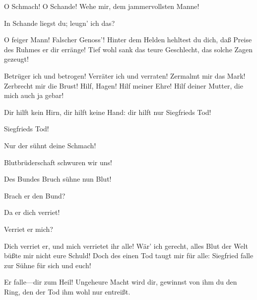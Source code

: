 \begin{drama}
O Schmach! O Schande!
Wehe mir, dem jammervollsten Manne!
 

\Hagenspeaks

In Schande liegst du;
leugn' ich das?
 

\Brunnhildespeaks



O feiger Mann! Falscher Genoss'!
Hinter dem Helden hehltest du dich,
daß Preise des Ruhmes er dir erränge!
Tief wohl sank das teure Geschlecht,
das solche Zagen gezeugt!
 

\Guntherspeaks



Betrüger ich und betrogen!
Verräter ich und verraten!
Zermalmt mir das Mark!
Zerbrecht mir die Brust!
Hilf, Hagen! Hilf meiner Ehre!
Hilf deiner Mutter,
die mich auch ja gebar!
 

\Hagenspeaks

Dir hilft kein Hirn,
dir hilft keine Hand:
dir hilft nur Siegfrieds Tod!
 

\Guntherspeaks



Siegfrieds Tod!
 

\Hagenspeaks

Nur der sühnt deine Schmach!
 

\Guntherspeaks



Blutbrüderschaft schwuren wir uns!
 

\Hagenspeaks

Des Bundes Bruch sühne nun Blut!
 

\Guntherspeaks

Brach er den Bund?
 

\Hagenspeaks

Da er dich verriet!
 

\Guntherspeaks

Verriet er mich?
 

\Brunnhildespeaks

Dich verriet er,
und mich verrietet ihr alle!
Wär' ich gerecht, alles Blut der Welt
büßte mir nicht eure Schuld!
Doch des einen Tod taugt mir für alle:
Siegfried falle zur Sühne für sich und euch!
 

\Hagenspeaks



Er falle---dir zum Heil!
Ungeheure Macht wird dir,
gewinnst von ihm du den Ring,
den der Tod ihm wohl nur entreißt.
 


\end{drama}
